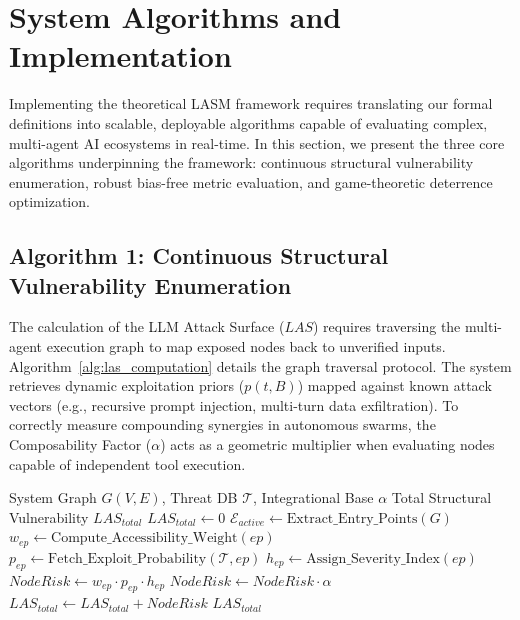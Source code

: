 \section{System Algorithms and Implementation}
\label{sec:algorithms}

Implementing the theoretical LASM framework requires translating our formal definitions into scalable, deployable algorithms capable of evaluating complex, multi-agent AI ecosystems in real-time. In this section, we present the three core algorithms underpinning the framework: continuous structural vulnerability enumeration, robust bias-free metric evaluation, and game-theoretic deterrence optimization.

\subsection{Algorithm 1: Continuous Structural Vulnerability Enumeration}

The calculation of the LLM Attack Surface ($LAS$) requires traversing the multi-agent execution graph to map exposed nodes back to unverified inputs. Algorithm~\ref{alg:las_computation} details the graph traversal protocol. The system retrieves dynamic exploitation priors ($p(t, B)$) mapped against known attack vectors (e.g., recursive prompt injection, multi-turn data exfiltration). To correctly measure compounding synergies in autonomous swarms, the Composability Factor ($\alpha$) acts as a geometric multiplier when evaluating nodes capable of independent tool execution.

\begin{algorithm}[h!]
\caption{Dynamic $LAS$ Structural Enumeration}
\label{alg:las_computation}
\begin{algorithmic}[1]
\REQUIRE System Graph $G(V, E)$, Threat DB $\mathcal{T}$, Integrational Base $\alpha$
\ENSURE Total Structural Vulnerability $LAS_{total}$
\STATE $LAS_{total} \leftarrow 0$
\STATE $\mathcal{E}_{active} \leftarrow \text{Extract\_Entry\_Points}(G)$
    \STATE $w_{ep} \leftarrow \text{Compute\_Accessibility\_Weight}(ep)$
    \STATE $p_{ep} \leftarrow \text{Fetch\_Exploit\_Probability}(\mathcal{T}, ep)$
    \STATE $h_{ep} \leftarrow \text{Assign\_Severity\_Index}(ep)$
    \STATE $NodeRisk \leftarrow w_{ep} \cdot p_{ep} \cdot h_{ep}$
        \STATE $NodeRisk \leftarrow NodeRisk \cdot \alpha$
    \ENDIF
    \STATE $LAS_{total} \leftarrow LAS_{total} + NodeRisk$
\ENDFOR
\RETURN $LAS_{total}$
\end{algorithmic}
\end{algorithm}

